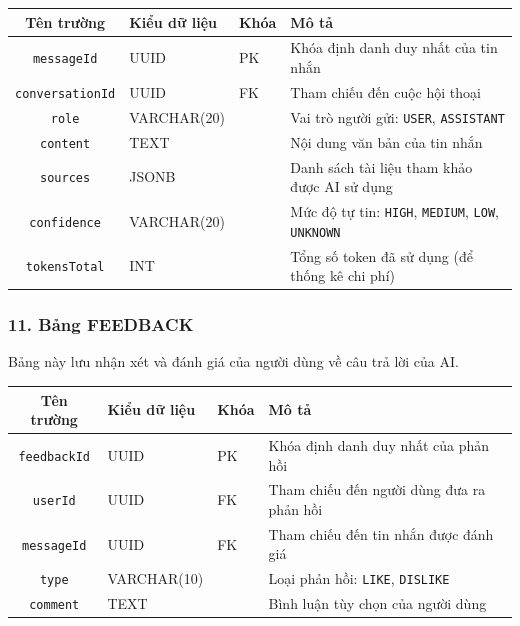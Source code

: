 \documentclass[12pt,a4paper]{report}
\begin{document}
\begin{table}[H]
\centering
\begin{tabularx}{\textwidth}{|c|l|l|X|}
\hline
\rowcolor{gray!10}
Tên trường & Kiểu dữ liệu & Khóa & Mô tả \\ \hline
\texttt{messageId} & UUID & PK & Khóa định danh duy nhất của tin nhắn \\ \hline
\texttt{conversationId} & UUID & FK & Tham chiếu đến cuộc hội thoại \\ \hline
\texttt{role} & VARCHAR(20) &  & Vai trò người gửi: \texttt{USER}, \texttt{ASSISTANT} \\ \hline
\texttt{content} & TEXT &  & Nội dung văn bản của tin nhắn \\ \hline
\texttt{sources} & JSONB &  & Danh sách tài liệu tham khảo được AI sử dụng \\ \hline
\texttt{confidence} & VARCHAR(20) &  & Mức độ tự tin: \texttt{HIGH}, \texttt{MEDIUM}, \texttt{LOW}, \texttt{UNKNOWN} \\ \hline
\texttt{tokensTotal} & INT &  & Tổng số token đã sử dụng (để thống kê chi phí) \\ \hline
\end{tabularx}
\end{table}

\subsubsection{11. Bảng FEEDBACK}
Bảng này lưu nhận xét và đánh giá của người dùng về câu trả lời của AI.

\begin{table}[H]
\centering
\begin{tabularx}{\textwidth}{|c|l|l|X|}
\hline
\rowcolor{gray!10}
Tên trường & Kiểu dữ liệu & Khóa & Mô tả \\ \hline
\texttt{feedbackId} & UUID & PK & Khóa định danh duy nhất của phản hồi \\ \hline
\texttt{userId} & UUID & FK & Tham chiếu đến người dùng đưa ra phản hồi \\ \hline
\texttt{messageId} & UUID & FK & Tham chiếu đến tin nhắn được đánh giá \\ \hline
\texttt{type} & VARCHAR(10) &  & Loại phản hồi: \texttt{LIKE}, \texttt{DISLIKE} \\ \hline
\texttt{comment} & TEXT &  & Bình luận tùy chọn của người dùng \\ \hline
\end{tabularx}
\end{table}
\end{document}
